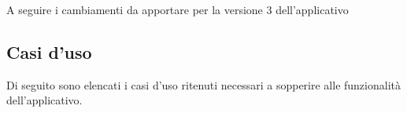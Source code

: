 A seguire i cambiamenti da apportare per la versione 3 dell'applicativo

\subsection{Casi d'uso}
Di seguito sono elencati i casi d'uso ritenuti necessari a sopperire alle funzionalità
dell'applicativo.
\\\\





\pagebreak
